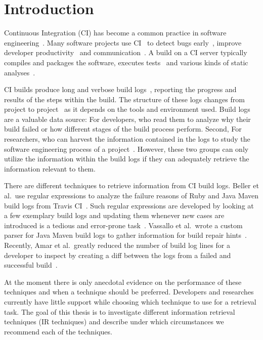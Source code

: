 \documentclass[\myrootdir/main.tex]{subfiles}
\begin{document}
\chapter{Introduction}
Continuous Integration (CI) has become a common practice in software engineering~\cite{hilton2016usage}.
Many software projects use CI~\cite{hilton2016usage,staahl2014modeling,beller2017oops} to detect bugs early~\cite{vasilescu2015quality,duvall2007continuous}, improve developer productivity~\cite{miller2008hundred,hilton2016usage} and communication~\cite{downs2012ambient}.
A build on a CI server typically compiles and packages the software, executes tests~\cite{beller2017oops} and various kinds of static analyses~\cite{zampetti2017open}.

CI builds produce long and verbose build logs~\cite{beller2017oops}, reporting the progress and results of the steps within the build.
The structure of these logs changes from project to project~\cite{staahl2014modeling} as it depends on the tools and environment used.
Build logs are a valuable data source: For developers, who read them to analyze why their build failed or how different stages of the build process perform.
Second, For researchers, who can harvest the information contained in the logs to study the software engineering process of a project~\cite{rausch2017empirical,beller2017oops,seo2014programmers,vassallo2017a-tale}.
However, these two groups can only utilize the information within the build logs if they can adequately retrieve the information relevant to them.

There are different techniques to retrieve information from CI build logs. Beller et al.\ use regular expressions to analyze the failure reasons of Ruby and Java Maven build logs from Travis CI~\cite{beller2017oops}.
Such regular expressions are developed by looking at a few exemplary build logs and updating them whenever new cases are introduced is a tedious and error-prone task~\cite{michael2019regexes}.
Vassallo et al.\ wrote a custom parser for Java Maven build logs to gather information for build repair hints~\cite{vassallo2018un-break}.
Recently, Amar et al.\ greatly reduced the number of build log lines for a developer to inspect by creating a diff between the logs from a failed and successful build~\cite{amar2019mining}.

At the moment there is only anecdotal evidence on the performance of these techniques and when a technique should be preferred.
Developers and researches currently have little support while choosing which technique to use for a retrieval task.
The goal of this thesis is to investigate different information retrieval techniques (IR techniques) and describe under which circumstances we recommend each of the techniques.
\end{document}
